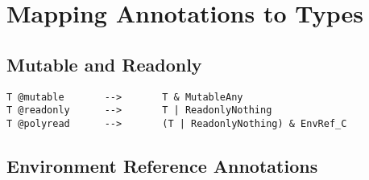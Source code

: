 \section{Mapping Annotations to Types}

\subsection{Mutable and Readonly}

\begin{lstlisting}
T @mutable       -->       T & MutableAny
T @readonly      -->       T | ReadonlyNothing
T @polyread      -->       (T | ReadonlyNothing) & EnvRef_C
\end{lstlisting}

\subsection{Environment Reference Annotations}

